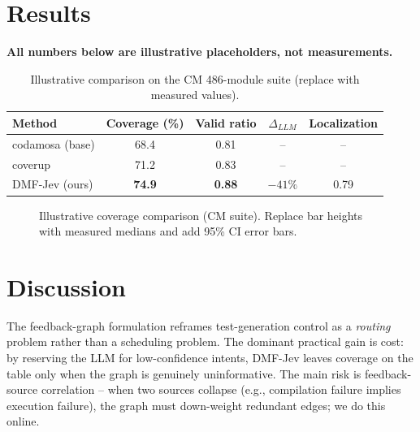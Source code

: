 \documentclass[11pt]{article}
\begin{document}
\section{Results}
\label{sec:results}
\textcolor{warn}{\textbf{All numbers below are illustrative placeholders, not measurements.}}
\begin{table}[h]
\centering
\caption{Illustrative comparison on the CM 486-module suite (replace with measured values).}
\label{tab:cm}
\begin{tabular}{lcccc}
\toprule
Method & Coverage (\%) & Valid ratio & $\Delta_{LLM}$ & Localization \\
\midrule
codamosa (base) & 68.4 & 0.81 & -- & -- \\
coverup & 71.2 & 0.83 & -- & -- \\
DMF-Jev (ours) & \textbf{74.9} & \textbf{0.88} & \textbf{$-41\%$} & 0.79 \\
\bottomrule
\end{tabular}
\end{table}

\begin{figure}[h]
\centering
{}
\caption{Illustrative coverage comparison (CM suite). Replace bar heights with measured medians and add 95\% CI error bars.}
\label{fig:bars}
\end{figure}

\section{Discussion}
The feedback-graph formulation reframes test-generation control as a \emph{routing} problem rather than a scheduling problem. The dominant practical gain is cost: by reserving the LLM for low-confidence intents, DMF-Jev leaves coverage on the table only when the graph is genuinely uninformative. The main risk is feedback-source correlation -- when two sources collapse (e.g., compilation failure implies execution failure), the graph must down-weight redundant edges; we do this online.
\end{document}
